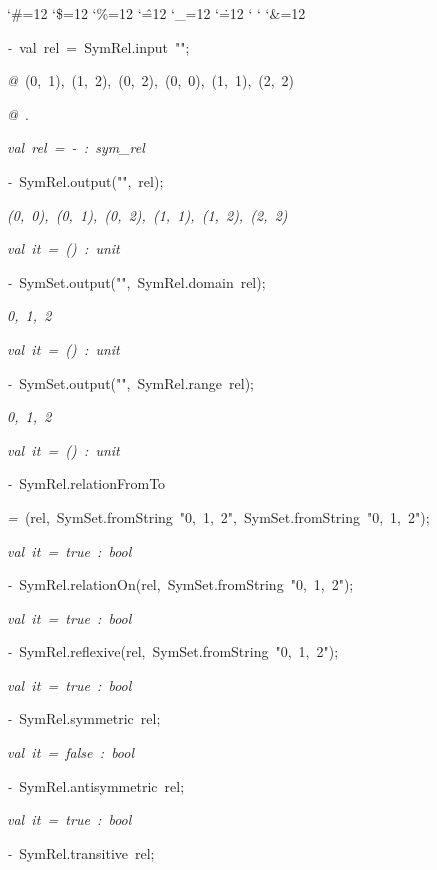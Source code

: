 \begin{list}{}
{\setlength{\leftmargin}{\leftmargini}
\setlength{\rightmargin}{0cm}
\setlength{\itemindent}{0cm}
\setlength{\listparindent}{0cm}
\setlength{\itemsep}{0cm}
\setlength{\parsep}{0cm}
\setlength{\labelsep}{0cm}
\setlength{\labelwidth}{0cm}
\catcode`\#=12
\catcode`\$=12
\catcode`\%=12
\catcode`\^=12
\catcode`\_=12
\catcode`\.=12
\catcode`
\catcode`
\catcode`\&=12
\ttfamily}
\small
\item[]\textsl{-\ }val\ rel\ =\ SymRel.input\ "";
\item[]\textsl{@\ }(0,\ 1),\ (1,\ 2),\ (0,\ 2),\ (0,\ 0),\ (1,\ 1),\ (2,\ 2)
\item[]\textsl{@\ }.
\item[]\textsl{val\ rel\ =\ -\ :\ sym_rel}
\item[]\textsl{-\ }SymRel.output("",\ rel);
\item[]\textsl{(0,\ 0),\ (0,\ 1),\ (0,\ 2),\ (1,\ 1),\ (1,\ 2),\ (2,\ 2)}
\item[]\textsl{val\ it\ =\ ()\ :\ unit}
\item[]\textsl{-\ }SymSet.output("",\ SymRel.domain\ rel);
\item[]\textsl{0,\ 1,\ 2}
\item[]\textsl{val\ it\ =\ ()\ :\ unit}
\item[]\textsl{-\ }SymSet.output("",\ SymRel.range\ rel);
\item[]\textsl{0,\ 1,\ 2}
\item[]\textsl{val\ it\ =\ ()\ :\ unit}
\item[]\textsl{-\ }SymRel.relationFromTo
\item[]\textsl{=\ }(rel,\ SymSet.fromString\ "0,\ 1,\ 2",\ SymSet.fromString\ "0,\ 1,\ 2");
\item[]\textsl{val\ it\ =\ true\ :\ bool}
\item[]\textsl{-\ }SymRel.relationOn(rel,\ SymSet.fromString\ "0,\ 1,\ 2");
\item[]\textsl{val\ it\ =\ true\ :\ bool}
\item[]\textsl{-\ }SymRel.reflexive(rel,\ SymSet.fromString\ "0,\ 1,\ 2");
\item[]\textsl{val\ it\ =\ true\ :\ bool}
\item[]\textsl{-\ }SymRel.symmetric\ rel;
\item[]\textsl{val\ it\ =\ false\ :\ bool}
\item[]\textsl{-\ }SymRel.antisymmetric\ rel;
\item[]\textsl{val\ it\ =\ true\ :\ bool}
\item[]\textsl{-\ }SymRel.transitive\ rel;

\end{list}
